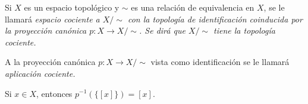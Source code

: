 
\begin{definition}
Si $X$ es un espacio topológico y $\sim$ es una relación de equivalencia en $X$, se le llamará \itshape{espacio cociente} a $X/\sim$ con la topología de identificación coinducida por la proyección canónica $p : X \longrightarrow X/\sim$. Se dirá que $X/\sim$ tiene la \itshape{topología cociente}.
\end{definition}

\begin{definition}
A la proyección canónica $p : X \longrightarrow X/\sim$ vista como identificación se le llamará \itshape{aplicación cociente}.
\end{definition}

\begin{remark}
Si $x \in X$, entonces $p^{-1}(\{ [ x ] \}) = [x]$.
\end{remark}
